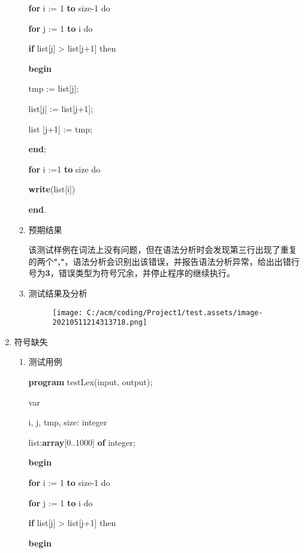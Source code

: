 \documentclass[]{ctexart}
\newenvironment{Shaded}{}{}
\newcommand{\DataTypeTok}[1]{\textcolor[rgb]{0.56,0.13,0.00}{#1}}
\newcommand{\DecValTok}[1]{\textcolor[rgb]{0.25,0.63,0.44}{#1}}
\newcommand{\KeywordTok}[1]{\textcolor[rgb]{0.00,0.44,0.13}{\textbf{#1}}}
\newcommand{\NormalTok}[1]{#1}
\begin{document}
\begin{enumerate}
\begin{enumerate}
\begin{Shaded}
\begin{Highlighting}[]
    \KeywordTok{for}\NormalTok{ i := }\DecValTok{1} \KeywordTok{to}\NormalTok{ size}\DecValTok{-1}\NormalTok{ do
}
	\KeywordTok{for}\NormalTok{ j := }\DecValTok{1} \KeywordTok{to}\NormalTok{ i do
}
	    \KeywordTok{if}\NormalTok{ list[j] > list[j+}\DecValTok{1}\NormalTok{] then
}
	    \KeywordTok{begin}

\NormalTok{		    tmp := list[j];
}
\NormalTok{		    list[j] := list[j+}\DecValTok{1}\NormalTok{];
}
\NormalTok{		    list [j+}\DecValTok{1}\NormalTok{] := tmp;
}
	    \KeywordTok{end}\NormalTok{;
}


    \KeywordTok{for}\NormalTok{ i :=}\DecValTok{1} \KeywordTok{to}\NormalTok{ size do
}
	\KeywordTok{write}\NormalTok{(list[i])
}
\KeywordTok{end}\NormalTok{.}
\end{Highlighting}
\end{Shaded}
  \item
    预期结果

    该测试样例在词法上没有问题，但在语法分析时会发现第三行出现了重复的两个\textbf{","}，语法分析会识别出该错误，并报告语法分析异常，给出出错行号为\textbf{3}，错误类型为符号冗余，并停止程序的继续执行。
  \item
    测试结果及分析

    \begin{figure}
    \centering
    \texttt{[image: C:/acm/coding/Project1/test.assets/image-20210511214313718.png]}
    \caption{}
    \end{figure}
  \end{enumerate}
\item
  符号缺失

  \begin{enumerate}
  \def\labelenumii{\arabic{enumii}.}
  \item
    测试用例

\begin{Shaded}
\begin{Highlighting}[]
\KeywordTok{program}\NormalTok{ testLex(input, output);
}
\NormalTok{var
}
\NormalTok{	i, j, tmp, size: integer
}
\NormalTok{	list:}\KeywordTok{array}\NormalTok{[}\DecValTok{0}\NormalTok{..}\DecValTok{1000}\NormalTok{] }\KeywordTok{of} \DataTypeTok{integer}\NormalTok{;
}
\KeywordTok{begin}

    \KeywordTok{for}\NormalTok{ i := }\DecValTok{1} \KeywordTok{to}\NormalTok{ size}\DecValTok{-1}\NormalTok{ do
}
	\KeywordTok{for}\NormalTok{ j := }\DecValTok{1} \KeywordTok{to}\NormalTok{ i do
}
	    \KeywordTok{if}\NormalTok{ list[j] > list[j+}\DecValTok{1}\NormalTok{] then
}
	    \KeywordTok{begin}


\end{Highlighting}
\end{Shaded}
\end{enumerate}
\end{enumerate}
\end{document}
